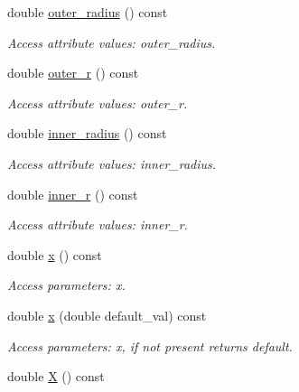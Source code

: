 \begin{DoxyCompactItemize}
double \hyperlink{struct_d_d4hep_1_1_x_m_l_1_1_child_value_a02b273a6addeb10cae0bf889d8c9dd7a}{outer\_\-radius} () const 
\begin{DoxyCompactList}\small\item\em Access attribute values: outer\_\-radius. \item\end{DoxyCompactList}\item 
double \hyperlink{struct_d_d4hep_1_1_x_m_l_1_1_child_value_a7c945d8f527043e8301af1e5fc55496a}{outer\_\-r} () const 
\begin{DoxyCompactList}\small\item\em Access attribute values: outer\_\-r. \item\end{DoxyCompactList}\item 
double \hyperlink{struct_d_d4hep_1_1_x_m_l_1_1_child_value_a50cebda86a6d28ef20fbcb1791acc82e}{inner\_\-radius} () const 
\begin{DoxyCompactList}\small\item\em Access attribute values: inner\_\-radius. \item\end{DoxyCompactList}\item 
double \hyperlink{struct_d_d4hep_1_1_x_m_l_1_1_child_value_a5f8d680cfaaba03683991a731fc0d4bf}{inner\_\-r} () const 
\begin{DoxyCompactList}\small\item\em Access attribute values: inner\_\-r. \item\end{DoxyCompactList}\item 
double \hyperlink{struct_d_d4hep_1_1_x_m_l_1_1_child_value_a28563173370d2f75b35591a60e37bb0b}{x} () const 
\begin{DoxyCompactList}\small\item\em Access parameters: x. \item\end{DoxyCompactList}\item 
double \hyperlink{struct_d_d4hep_1_1_x_m_l_1_1_child_value_a4b6d098ee81d240d5a12671d8de50e76}{x} (double default\_\-val) const 
\begin{DoxyCompactList}\small\item\em Access parameters: x, if not present returns default. \item\end{DoxyCompactList}\item 
double \hyperlink{struct_d_d4hep_1_1_x_m_l_1_1_child_value_a350863cb3ef1e42b1c16d01fa5f759d5}{X} () const 

\end{DoxyCompactItemize}
